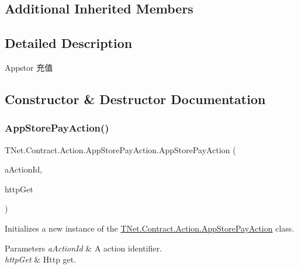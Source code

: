 \subsection*{Additional Inherited Members}


\subsection{Detailed Description}
Appstor 充值 



\subsection{Constructor \& Destructor Documentation}
\mbox{\label{class_t_net_1_1_contract_1_1_action_1_1_app_store_pay_action_a0dc9a21fc94a4a98a1a26eec2725637b}} 
\subsubsection{\texorpdfstring{App\+Store\+Pay\+Action()}{AppStorePayAction()}}
{\footnotesize\ttfamily T\+Net.\+Contract.\+Action.\+App\+Store\+Pay\+Action.\+App\+Store\+Pay\+Action (\begin{DoxyParamCaption}\item[{short}]{a\+Action\+Id,  }\item[{\mbox{\hyperlink{class_t_net_1_1_service_1_1_action_getter}{Action\+Getter}}}]{http\+Get }\end{DoxyParamCaption})}



Initializes a new instance of the \mbox{\hyperlink{class_t_net_1_1_contract_1_1_action_1_1_app_store_pay_action}{T\+Net.\+Contract.\+Action.\+App\+Store\+Pay\+Action}} class. 


\begin{DoxyParams}{Parameters}
{\em a\+Action\+Id} & A action identifier.\\
\hline
{\em http\+Get} & Http get.\\
\hline
\end{DoxyParams}


